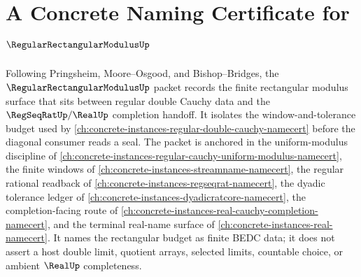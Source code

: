 \chapter{A Concrete Naming Certificate for $\RegularRectangularModulusUp$}
\label{ch:concrete-instances-regular-rectangular-modulus-namecert}

Following Pringsheim, Moore--Osgood, and Bishop--Bridges, the $\RegularRectangularModulusUp$ packet records the finite rectangular modulus surface that sits between regular double Cauchy data and the $\RegSeqRatUp/\RealUp$ completion handoff. It isolates the window-and-tolerance budget used by \autoref{ch:concrete-instances-regular-double-cauchy-namecert} before the diagonal consumer reads a seal. The packet is anchored in the uniform-modulus discipline of \autoref{ch:concrete-instances-regular-cauchy-uniform-modulus-namecert}, the finite windows of \autoref{ch:concrete-instances-streamname-namecert}, the regular rational readback of \autoref{ch:concrete-instances-regseqrat-namecert}, the dyadic tolerance ledger of \autoref{ch:concrete-instances-dyadicratcore-namecert}, the completion-facing route of \autoref{ch:concrete-instances-real-cauchy-completion-namecert}, and the terminal real-name surface of \autoref{ch:concrete-instances-real-namecert}. It names the rectangular budget as finite BEDC data; it does not assert a host double limit, quotient arrays, selected limits, countable choice, or ambient $\RealUp$ completeness.

